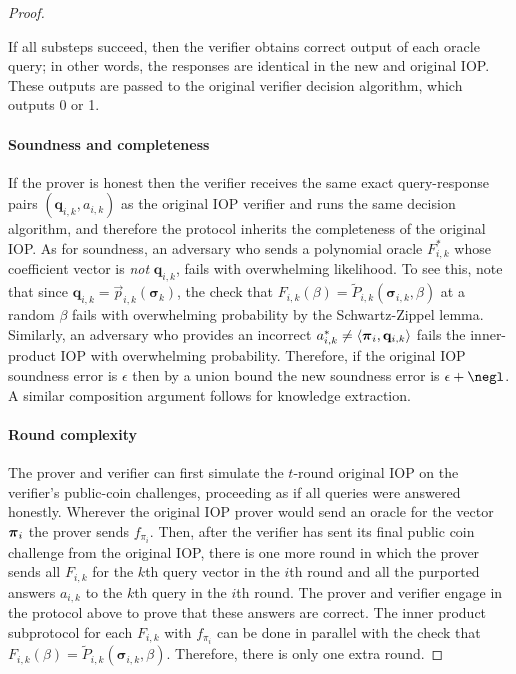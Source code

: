 \begin{proof}
\begin{itemize}
\end{itemize}

If all substeps succeed, then the verifier obtains correct output of each oracle query; in other words, the responses are identical in the new and original IOP. These outputs are passed to the original verifier decision algorithm, which outputs 0 or 1.

\paragraph{Soundness and completeness} If the prover is honest then the verifier receives the same exact query-response pairs $(\mathbf{q}_{i,k}, a_{i,k})$ as the original IOP verifier and runs the same decision algorithm, and therefore the protocol inherits the completeness of the original IOP. As for soundness, an adversary who sends a polynomial oracle $F_{i,k}^*$ whose coefficient vector is \emph{not} $\mathbf{q}_{i,k}$, fails with overwhelming likelihood. To see this, note that since $\mathbf{q}_{i,k} = \vec{p}_{i,k}(\boldsymbol{\sigma}_k)$, the check that $F_{i,k} (\beta) = \tilde{P}_{i,k}(\boldsymbol{\sigma}_{i,k}, \beta)$ at a random $\beta$ fails with overwhelming probability by the Schwartz-Zippel lemma. Similarly, an adversary who provides an incorrect $a_{i,k}^* \neq \langle \boldsymbol{\pi}_i, \mathbf{q}_{i,k} \rangle$ fails the inner-product IOP with overwhelming probability.
Therefore, if the original IOP soundness error is $\epsilon$ then by a union bound the new soundness error is $\epsilon + \negl$. A similar composition argument follows for knowledge extraction.%

\paragraph{Round complexity} The prover and verifier can first simulate the $t$-round original IOP  on the verifier's public-coin challenges, proceeding as if all queries were answered honestly. Wherever the original IOP prover would send an oracle for the vector $\boldsymbol{\pi}_i$ the prover sends $f_{\pi_i}$. Then, after the verifier has sent its final public coin challenge from the original IOP, there is one more round in which the prover sends all $F_{i, k}$ for the $k$th query vector in the $i$th round and all the purported answers $a_{i, k}$ to the $k$th query in the $i$th round. The prover and verifier engage in the protocol above to prove that these answers are correct. The inner product subprotocol for each $F_{i,k}$ with $f_{\pi_i}$ can be done in parallel with the check that $F_{i,k}(\beta) = \tilde{P}_{i,k}(\boldsymbol{\sigma}_{i,k}, \beta)$. Therefore, there is only one extra round.   
\end{proof}

